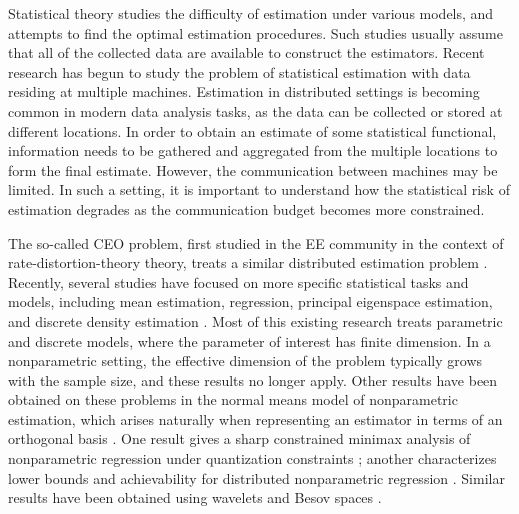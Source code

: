 \statbackground{}
Statistical theory studies the difficulty of estimation under
various models, and attempts to find the optimal estimation
procedures.  Such studies usually assume that all of the collected
data are available to construct the estimators.  Recent research
has begun to study the problem of statistical estimation with data
residing at
multiple machines.  Estimation in distributed settings is becoming
common in modern data analysis tasks, as the data can be collected or
stored at different locations.  In order to obtain an estimate of some
statistical functional, information needs to be gathered and
aggregated from the multiple locations to form the final
estimate. However, the communication between machines may be
limited. In such a setting, it is important to understand how the
statistical risk of estimation degrades as the communication budget
becomes more constrained.

The so-called CEO problem, first studied in the EE 
community in the context of rate-distortion-theory theory, treats a
similar distributed estimation problem \citep{berger1996ceo,
  viswanathan1997quadratic}.  Recently, several studies have
focused on more specific statistical tasks and models, including mean
estimation, regression, principal eigenspace estimation, and discrete
density estimation \citep{zhang2013information, shamir2014fundamental,
  battey2015distributed, braverman2016communication,
  diakonikolas2017communication, fan2017distributed,
  lee2017communication, shang2017computational}. Most of this existing
research treats parametric and discrete models, where the
parameter of interest has finite dimension.  In a nonparametric
setting, the effective dimension of the problem typically grows with
the sample size, and these results no longer apply.
Other results have been obtained on these problems in the normal means
model of nonparametric estimation, which arises naturally when representing an estimator in terms of an
orthogonal
basis \citep{johnstone2002function,tsybakov:2008}.  One
result gives a sharp constrained minimax analysis of nonparametric
regression under quantization constraints \citep{Zhu:18}; another
characterizes lower bounds and achievability for distributed
nonparametric regression \citep{Zhu:18b}. Similar results have been obtained 
using wavelets and Besov spaces \citep{szabo18}.


